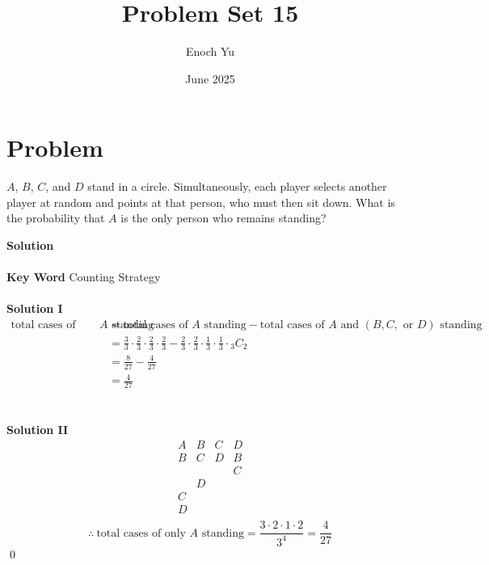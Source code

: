\documentclass{article}
\title{Problem Set 15}
\author{Enoch Yu}
\date{June 2025}
\newenvironment{solution}{\begin{trivlist}\item[]{\bf Solution}}{\qed \end{trivlist}}
\begin{document}
\section*{Problem}
$A$, $B$, $C$, and $D$ stand in a circle. Simultaneously, each player selects another player at random and points at that person, who must then sit down. What is the probability that $A$ is the only person who remains standing?
\begin{solution}
\\\\
\textbf{Key Word} Counting Strategy
\\\\
\textbf{Solution I} \\
\begin{align*}
\text{total cases of only $A$ standing}&=\text{total cases of $A$ standing}-\text{total cases of $A$ and $(B,C,\text{ or }D)$ standing} \\
&=\frac{3}{3}\cdot\frac{2}{3}\cdot\frac{2}{3}\cdot\frac{2}{3}-\frac{2}{3}\cdot\frac{2}{3}\cdot\frac{1}{3}\cdot\frac{1}{3}\cdot{}_3C_2 \\
&=\frac{8}{27}-\frac{4}{27} \\
&=\boxed{\frac{4}{27}}
\end{align*}
\\\\
\textbf{Solution II} \\
\[
\begin{array}{cccc}
    A & B & C & D \\
    \hline
    B & C & D & B \\
      &   &   & C \\
      & D &   &   \\
    C \\
    D \\
\end{array}
\]
\[
\therefore\ \text{total cases of only $A$ standing}=\frac{3\cdot2\cdot1\cdot2}{3^4}=\boxed{\frac{4}{27}}
\]
\end{solution}

\newpage
\end{document}
